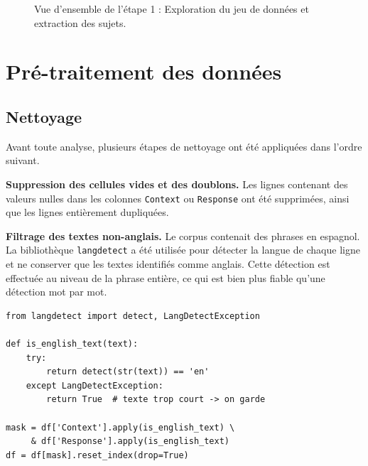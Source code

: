\documentclass[12pt,a4paper]{article}
\begin{document}
\begin{figure}[htbp]
\caption{\centering Vue d'ensemble de l'étape 1 : \break Exploration du jeu de données et extraction des sujets.}
\label{fig:flowchart-etape1}
\end{figure}

\pagebreak
\section{Pré-traitement des données}

\subsection{Nettoyage}

Avant toute analyse, plusieurs étapes de nettoyage ont été appliquées dans l'ordre suivant.

\textbf{Suppression des cellules vides et des doublons.}
Les lignes contenant des valeurs nulles dans les colonnes \texttt{Context} ou \texttt{Response}
ont été supprimées, ainsi que les lignes entièrement dupliquées.

\textbf{Filtrage des textes non-anglais.}
Le corpus contenait des phrases en espagnol. La bibliothèque \texttt{langdetect} a été utilisée
pour détecter la langue de chaque ligne et ne conserver que les textes identifiés comme anglais.
Cette détection est effectuée au niveau de la phrase entière, ce qui est bien plus fiable qu'une
détection mot par mot.

\begin{lstlisting}
from langdetect import detect, LangDetectException

def is_english_text(text):
    try:
        return detect(str(text)) == 'en'
    except LangDetectException:
        return True  # texte trop court -> on garde

mask = df['Context'].apply(is_english_text) \
     & df['Response'].apply(is_english_text)
df = df[mask].reset_index(drop=True)
\end{lstlisting}
\end{document}
